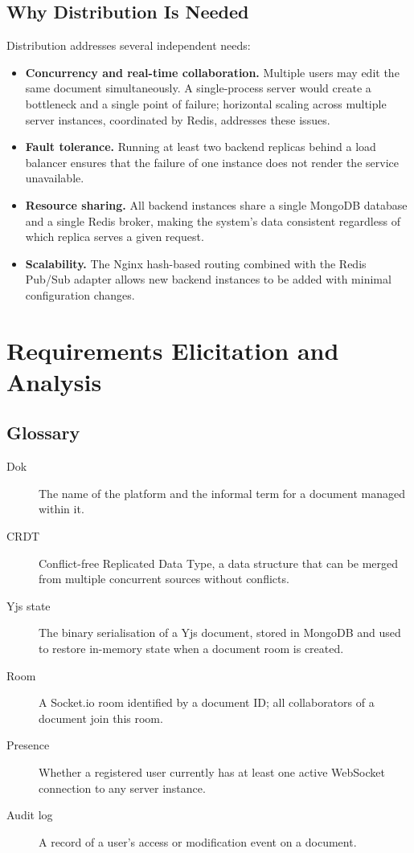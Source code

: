 \documentclass{scrartcl}
\begin{document}
  \subsection{Why Distribution Is Needed}

  Distribution addresses several independent needs:

  \begin{itemize}
    \item \textbf{Concurrency and real-time collaboration.} Multiple users may edit the same
    document simultaneously. A single-process server would create a bottleneck and a single
    point of failure; horizontal scaling across multiple server instances, coordinated by Redis,
    addresses these issues.
    \item \textbf{Fault tolerance.} Running at least two backend replicas behind a load balancer
    ensures that the failure of one instance does not render the service unavailable.
    \item \textbf{Resource sharing.} All backend instances share a single MongoDB database and a
    single Redis broker, making the system's data consistent regardless of which replica serves a
    given request.
    \item \textbf{Scalability.} The Nginx hash-based routing combined with the Redis Pub/Sub
    adapter allows new backend instances to be added with minimal configuration changes.
  \end{itemize}


  \section{Requirements Elicitation and Analysis}\label{requirements}

  \subsection{Glossary}

  \begin{description}
    \item[Dok] The name of the platform and the informal term for a document managed within it.
    \item[CRDT] Conflict-free Replicated Data Type, a data structure that can be merged from
    multiple concurrent sources without conflicts.
    \item[Yjs state] The binary serialisation of a Yjs document, stored in MongoDB and used to
    restore in-memory state when a document room is created.
    \item[Room] A Socket.io room identified by a document ID; all collaborators of a document
    join this room.
    \item[Presence] Whether a registered user currently has at least one active WebSocket
    connection to any server instance.
    \item[Audit log] A record of a user's access or modification event on a document.
  \end{description}
\end{document}
